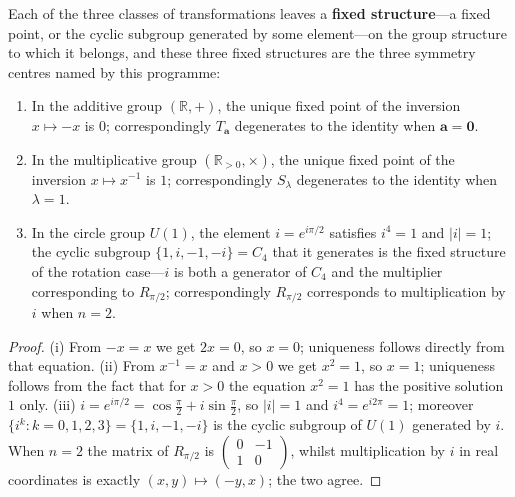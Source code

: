 \begin{proposition}\label{prop:three_centres}
Each of the three classes of transformations leaves a \textbf{fixed structure}---a fixed point, or the cyclic subgroup generated by some element---on the group structure to which it belongs, and these three fixed structures are the three symmetry centres named by this programme:
\begin{enumerate}[label=(\roman*)]
    \item In the additive group $(\mathbb{R},+)$, the unique fixed point of the inversion $x \mapsto -x$ is $0$; correspondingly $T_{\mathbf a}$ degenerates to the identity when $\mathbf a=\mathbf 0$.
    \item In the multiplicative group $(\mathbb{R}_{>0},\times)$, the unique fixed point of the inversion $x \mapsto x^{-1}$ is $1$; correspondingly $S_\lambda$ degenerates to the identity when $\lambda=1$.
    \item In the circle group $U(1)$, the element $i = e^{i\pi/2}$ satisfies $i^4 = 1$ and $|i| = 1$; the cyclic subgroup $\{1,i,-1,-i\}=C_4$ that it generates is the fixed structure of the rotation case---$i$ is both a generator of $C_4$ and the multiplier corresponding to $R_{\pi/2}$; correspondingly $R_{\pi/2}$ corresponds to multiplication by $i$ when $n=2$.
\end{enumerate}
\end{proposition}

\begin{proof}
(i) From $-x=x$ we get $2x=0$, so $x=0$; uniqueness follows directly from that equation. (ii) From $x^{-1}=x$ and $x>0$ we get $x^2=1$, so $x=1$; uniqueness follows from the fact that for $x>0$ the equation $x^2=1$ has the positive solution $1$ only. (iii) $i=e^{i\pi/2}=\cos\frac\pi2+i\sin\frac\pi2$, so $|i|=1$ and $i^4=e^{i2\pi}=1$; moreover $\{i^k:k=0,1,2,3\}=\{1,i,-1,-i\}$ is the cyclic subgroup of $U(1)$ generated by $i$. When $n=2$ the matrix of $R_{\pi/2}$ is $\left(\begin{smallmatrix}0&-1\\1&0\end{smallmatrix}\right)$, whilst multiplication by $i$ in real coordinates is exactly $(x,y)\mapsto(-y,x)$; the two agree.
\end{proof}

